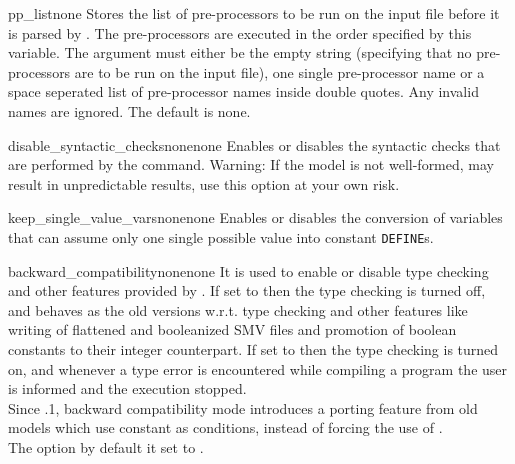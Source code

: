 \begin{nusmvVar} {pp\_list}{}{none}
Stores the list of pre-processors to be run on the input file before
it is parsed by \nusmv. The pre-processors are executed in the order
specified by this variable. The argument must either be the empty
string (specifying that no pre-processors are to be run on the input
file), one single pre-processor name or a space seperated list of
pre-processor names inside double quotes. Any invalid names are
ignored. The default is none.
\end{nusmvVar}



\begin{nusmvVar} {disable\_syntactic\_checks}{none}{none}
Enables or disables the syntactic checks that are performed by
the  command. Warning: If the model
is not well-formed, \nusmv may result in unpredictable results, use
this option at your own risk.
\end{nusmvVar}

\begin{nusmvVar} {keep\_single\_value\_vars}{none}{none}
Enables or disables the conversion of variables that can assume only
one single possible value into constant \texttt{DEFINE}s.
\end{nusmvVar}

\label{ref::backwardcompatibility}
\begin{nusmvVar} {backward\_compatibility}{none}{none}
  It is used to enable or disable type checking and other features
  provided by \NuSMV. If set to  then the type checking is
  turned off, and \nusmv behaves as the old versions w.r.t. type
  checking and other features like writing of flattened and
  booleanized SMV files and promotion of boolean constants to their
  integer counterpart. If set to  then the type checking is
  turned on, and whenever a type error is encountered while compiling
  a \nusmv program the user is informed and the execution stopped.
 \\

  Since .1, backward compatibility mode introduces a porting
  feature from old models which use constant  as 
  conditions, instead of forcing the use of .
\\

  The option by default it set to .
\end{nusmvVar}


